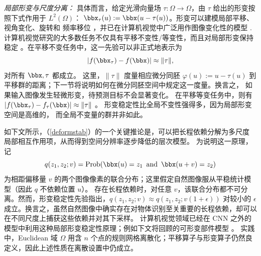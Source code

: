 {{\em 局部形变与尺度分离：}}
具体而言，给定光滑向量场 $\tau: \Omega \to \Omega$，由 $\tau$ 给出的形变按照下式作用于 $L^2(\Omega)$：
$\bbx_\tau(u) := \bbx(u -\tau(u))$。形变可以建模局部平移、视角变化、旋转和
频率移位 \cite{bruna2013invariant}，并已在计算机视觉中广泛用作图像变化性的模型
\cite{jain1996object, felzenszwalb2010object, girshick2014rich}.
计算机视觉研究的大多数任务不仅具有平移不变性/等变性，而且对局部形变保持稳定 \cite{mallat2016understanding,bruna2013invariant}。在平移不变任务中，这一先验可以非正式地表示为
\begin{equation}
\label{deformstab}
| f( \bbx_\tau) - f( \bbx) | \approx \| \tau \|,
\end{equation}
对所有 $\bbx, \tau$ 都成立。
这里，$\| \tau \| $ 度量相应微分同胚 $\varphi(u):= u - \tau(u)$ 到平移群的距离；下一节将说明如何在微分同胚空间中规定这一度量。换言之，
如果输入图像发生轻微形变，待预测目标不会显著变化。
%
在平移等变任务中，则有 $| f( \bbx_\tau ) -  f_\tau( \bbx) | \approx \|  \tau \| $
。
形变稳定性比全局不变性强得多，因为局部形变空间是高维的，
而全局不变量的群并非如此。

如下文所示，（\ref{deformstab}）的一个关键推论是，可以把长程依赖分解为多尺度
局部相互作用项，从而得到空间分辨率逐步降低的层次模型。
为说明这一原理，
记
 \begin{equation}
q(z_1, z_2;v) = \mathrm{Prob}( \bbx(u) = z_1 \,\,\, \mathrm{and} \,\,\, \bbx(u+v)=z_2)
 \end{equation}
为相距偏移量 $v$ 的两个图像像素的联合分布；这里假定自然图像服从平稳统计模型（因此 $q$ 不依赖位置 $u$）。
存在长程依赖时，对任意 $v$，该联合分布都不可分离。然而，形变稳定性先验指出，$q(z_1, z_2; v) \approx q(z_1, z_2; v(1+\epsilon))$ 对较小的 $\epsilon$ 成立。换言之，虽然自然图像中确实存在对物体识别至关重要的长程依赖，却可以在不同尺度上捕获这些依赖并对其下采样。
计算机视觉领域已经在 CNN 之外的模型中利用这种局部形变稳定性原理；例如下文将回顾的可形变部件模型 \cite{felzenszwalb2010object}。
实践中，Euclidean 域 $\Omega$ 用含 $n$ 个点的规则网格离散化；平移算子与形变算子仍然良定义，因此上述性质在离散设置中仍成立。

